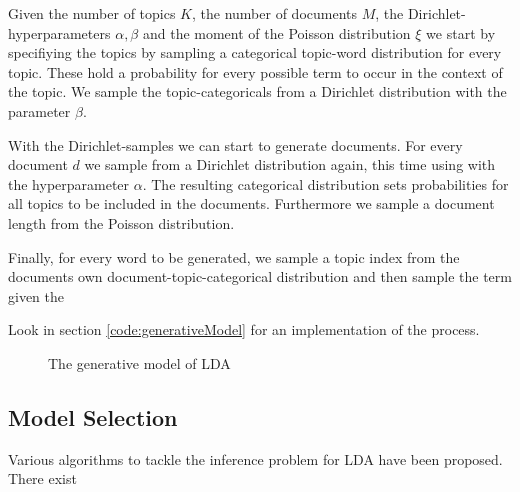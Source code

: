 \documentclass[12pt,landscape,twopage]{article}
\begin{document}
Given the number of topics \(K\), the number of documents \(M\), the Dirichlet-hyperparameters \(\alpha,\beta\) and the moment of the Poisson distribution \( \xi \) we start by specifiying the topics by sampling a categorical topic-word distribution for every topic. These hold a probability for every possible term to occur in the context of the topic. We sample the topic-categoricals from a Dirichlet distribution with the parameter \(\beta\).

With the Dirichlet-samples we can start to generate documents. For every document \( d \) we sample from a Dirichlet distribution again, this time using with the hyperparameter \( \alpha \). The resulting categorical distribution sets probabilities for all topics to be included in the documents. Furthermore we sample a document length from the Poisson distribution.

Finally, for every word to be generated, we sample a topic index from the documents own document-topic-categorical distribution and then sample the term given the

Look in section \ref{code:generativeModel} for an implementation of the process.
\onecolumn
\begin{figure}[h]
 \begin{center}
  \begin{algorithm}[H]
   
  \end{algorithm}
  \caption{The generative model of LDA  \cite{Blei2003,Heinrich2005}}\label{fig:generativeProcess}
 \end{center}
\end{figure}
\subsection{Model Selection}
Various algorithms to tackle the inference problem for LDA have been proposed. There exist
\end{document}

